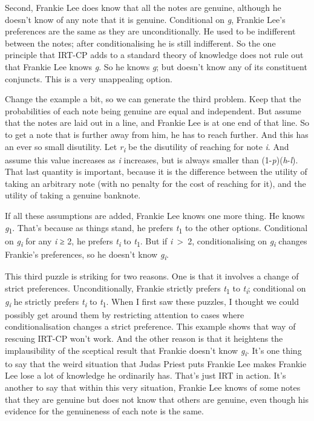 \documentclass[
  11pt,
]{book}
\begin{document}
Second, Frankie Lee does know that all the notes are genuine, although he doesn't know of any note that it is genuine. Conditional on \emph{g}, Frankie Lee's preferences are the same as they are unconditionally. He used to be indifferent between the notes; after conditionalising he is still indifferent. So the one principle that IRT-CP adds to a standard theory of knowledge does not rule out that Frankie Lee knows \emph{g}. So he knows \emph{g}; but doesn't know any of its constituent conjuncts. This is a very unappealing option.

Change the example a bit, so we can generate the third problem. Keep that the probabilities of each note being genuine are equal and independent. But assume that the notes are laid out in a line, and Frankie Lee is at one end of that line. So to get a note that is further away from him, he has to reach further. And this has an ever so small disutility. Let \emph{r\textsubscript{i}} be the disutility of reaching for note \emph{i}. And assume this value increases as \emph{i} increases, but is always smaller than (1-\emph{p})(\emph{h}-\emph{l}). That last quantity is important, because it is the difference between the utility of taking an arbitrary note (with no penalty for the cost of reaching for it), and the utility of taking a genuine banknote.

If all these assumptions are added, Frankie Lee knows one more thing. He knows \emph{g}\textsubscript{1}. That's because as things stand, he prefers \emph{t}\textsubscript{1} to the other options. Conditional on \emph{g\textsubscript{i}} for any \emph{i} ≥ 2, he prefers \emph{t\textsubscript{i}} to \emph{t}\textsubscript{1}. But if \emph{i}~\textgreater~2, conditionalising on \emph{g\textsubscript{i}} changes Frankie's preferences, so he doesn't know \emph{g\textsubscript{i}}.

This third puzzle is striking for two reasons. One is that it involves a change of strict preferences. Unconditionally, Frankie strictly prefers \emph{t}\textsubscript{1} to \emph{t\textsubscript{i}}; conditional on \emph{g\textsubscript{i}} he strictly prefers \emph{t\textsubscript{i}} to \emph{t}\textsubscript{1}. When I first saw these puzzles, I thought we could possibly get around them by restricting attention to cases where conditionalisation changes a strict preference. This example shows that way of rescuing IRT-CP won't work. And the other reason is that it heightens the implausibility of the sceptical result that Frankie doesn't know \emph{g\textsubscript{i}}. It's one thing to say that the weird situation that Judas Priest puts Frankie Lee makes Frankie Lee lose a lot of knowledge he ordinarily has. That's just IRT in action. It's another to say that within this very situation, Frankie Lee knows of some notes that they are genuine but does not know that others are genuine, even though his evidence for the genuineness of each note is the same.
\end{document}

